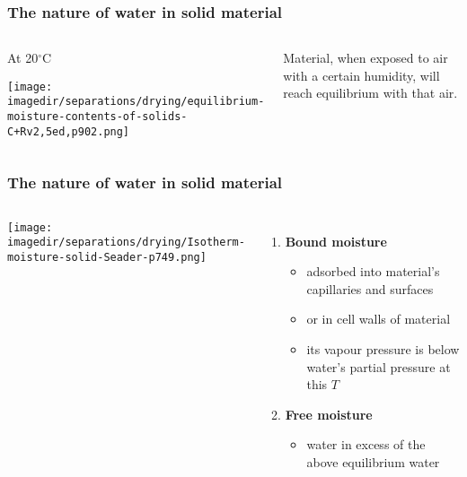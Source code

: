\begin{frame}\frametitle{The nature of water in solid material}
	\begin{columns}[c]
			\begin{center}
				At 20$^\circ\text{C}$
				
				\texttt{[image: \\imagedir/separations/drying/equilibrium-moisture-contents-of-solids-C+Rv2,5ed,p902.png]}
			\end{center}
			\vspace{-12pt}
			Material, when exposed to air with a certain humidity, will reach equilibrium with that air.
			\vspace{3cm}
	\end{columns}
\end{frame}

\begin{frame}\frametitle{The nature of water in solid material}
	\begin{columns}[c]
			\begin{center}
				\texttt{[image: \\imagedir/separations/drying/Isotherm-moisture-solid-Seader-p749.png]}
			\end{center}

			\begin{enumerate}
				\item	\textbf{Bound moisture}
				\begin{itemize}
					\item	adsorbed into material's capillaries and surfaces
					\item	or in cell walls of material
					\item	its vapour pressure is below water's partial pressure at this $T$
				\end{itemize}
				\item	\textbf{Free moisture}
				\begin{itemize}
					\item	water in excess of the above equilibrium water
				\end{itemize}
			\end{enumerate}
			\vspace{3cm}
	\end{columns}
\end{frame}

